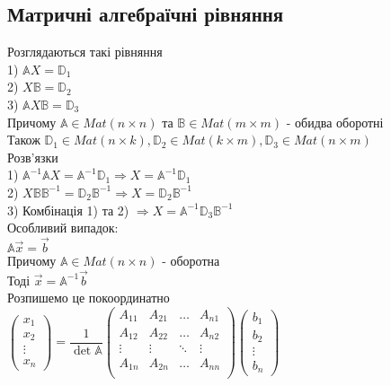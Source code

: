 \documentclass[a4paper, 14pt]{extarticle}
\def\bigline{\vspace{5mm}\\}
\begin{document}
\subsection{Матричні алгебраїчні рівняння}
Розглядаються такі рівняння\\
1) $\mathbb{A} X = \mathbb{D}_1$\\
2) $X \mathbb{B} = \mathbb{D}_2$\\
3) $\mathbb{A} X \mathbb{B} = \mathbb{D}_3$\\
Причому $\mathbb{A} \in Mat(n \times n)$ та $\mathbb{B} \in Mat(m \times m)$ - обидва оборотні\\
Також $\mathbb{D}_1 \in Mat(n \times k), \mathbb{D}_2 \in Mat(k \times m), \mathbb{D}_3 \in Mat(n \times m)$\\
Розв'язки\\
1) $\mathbb{A}^{-1} \mathbb{A} X = \mathbb{A}^{-1} \mathbb{D}_1 \Rightarrow X = \mathbb{A}^{-1} \mathbb{D}_1$\\
2) $X \mathbb{B} \mathbb{B}^{-1} = \mathbb{D}_2 \mathbb{B}^{-1} \Rightarrow X = \mathbb{D}_2 \mathbb{B}^{-1}$\\
3) Комбінація 1) та 2) $\Rightarrow X = \mathbb{A}^{-1} \mathbb{D}_3 \mathbb{B}^{-1}$
\bigline
Особливий випадок:\\
$\mathbb{A} \vec{x} = \vec{b}$\\
Причому $\mathbb{A} \in Mat(n \times n)$ - оборотна\\
Тоді $\vec{x} = \mathbb{A}^{-1} \vec{b}$\\
Розпишемо це покоординатно\\
$\begin{pmatrix}
x_1 \\ x_2 \\ \vdots \\ x_n
\end{pmatrix} = \dfrac{1}{\det \mathbb{A}} \begin{pmatrix}
A_{11} & A_{21} & \dots & A_{n1} \\
A_{12} & A_{22} & \dots & A_{n2} \\
\vdots & \vdots & \ddots & \vdots \\
A_{1n} & A_{2n} & \dots & A_{nn} \\
\end{pmatrix} \begin{pmatrix}
b_1 \\ b_2 \\ \vdots \\ b_n
\end{pmatrix}$\\
\end{document}
